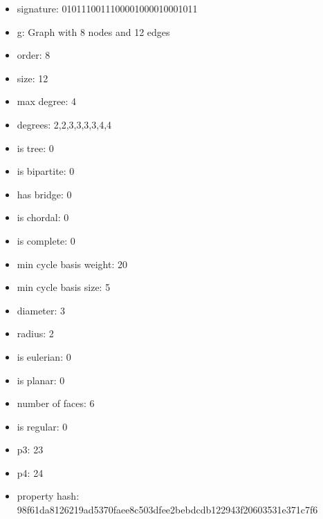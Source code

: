 \begin{itemize}
\item signature: 0101110011100001000010001011
\item g: Graph with 8 nodes and 12 edges
\item order: 8
\item size: 12
\item max degree: 4
\item degrees: 2,2,3,3,3,3,4,4
\item is tree: 0
\item is bipartite: 0
\item has bridge: 0
\item is chordal: 0
\item is complete: 0
\item min cycle basis weight: 20
\item min cycle basis size: 5
\item diameter: 3
\item radius: 2
\item is eulerian: 0
\item is planar: 0
\item number of faces: 6
\item is regular: 0
\item p3: 23
\item p4: 24
\item property hash: 98f61da8126219ad5370faee8c503dfee2bebdcdb122943f20603531e371c7f6
\end{itemize}
\newpage
\begin{figure}
\end{figure}
